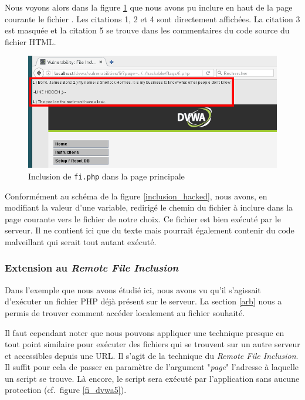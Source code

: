 Nous voyons alors dans la figure \ref{fi_dvwa4} que nous avons pu inclure en haut de la page courante le fichier . Les citations 1, 2 et 4 sont directement affichées. La citation 3 est masquée et la citation 5 se trouve dans les commentaires du code source du fichier HTML.

\begin{figure}[!h]
\begin{center}
\includegraphics[scale=.6]{images/fi4.png}

\caption{Inclusion de \texttt{fi.php} dans la page principale}
\label{fi_dvwa4}
\end{center}
\end{figure}

Conformément au schéma de la figure \ref{inclusion_hacked}, nous avons, en modifiant la valeur d'une variable, redirigé le chemin du fichier à inclure dans la page courante vers le fichier de notre choix. Ce fichier  est bien exécuté par le serveur. Il ne contient ici que du texte mais pourrait également contenir du code malveillant qui serait tout autant exécuté.

\subsubsection{Extension au \textit{Remote File Inclusion}}

Dans l'exemple que nous avons étudié ici, nous avons vu qu'il s'agissait d'exécuter un fichier PHP déjà présent sur le serveur. La section \ref{arb} nous a permis de trouver comment accéder localement au fichier souhaité.

Il faut cependant noter que nous pouvons appliquer une technique presque en tout point similaire pour exécuter des fichiers qui se trouvent sur un autre serveur et accessibles depuis une URL. Il s'agit de la technique du \textit{Remote File Inclusion}. Il suffit pour cela de passer en paramètre de l'argument "\textit{page}" l'adresse à laquelle un script se trouve. Là encore, le script sera exécuté par l'application sans aucune protection (cf.\ figure \ref{fi_dvwa5}).


